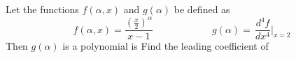 Let the functions $f(\alpha,x)$ and $g(\alpha)$ be defined as \[f(\alpha,x)=\dfrac{(\frac{x}{2})^\alpha}{x-1}\qquad\qquad\qquad g(\alpha)=\,\dfrac{d^4f}{dx^4}|_{x=2}\] Then $g(\alpha)$ is a polynomial is   Find the leading coefficient of 